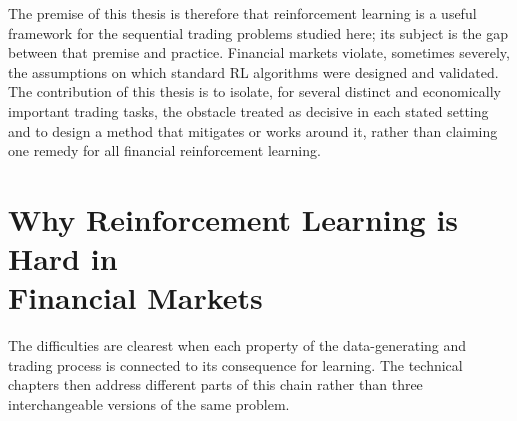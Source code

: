 The premise of this thesis is therefore that reinforcement learning is a useful framework for the sequential trading problems studied here; its subject is the gap between that premise and practice. Financial markets violate, sometimes severely, the assumptions on which standard RL algorithms were designed and validated. The contribution of this thesis is to isolate, for several distinct and economically important trading tasks, the obstacle treated as decisive in each stated setting and to design a method that mitigates or works around it, rather than claiming one remedy for all financial reinforcement learning.

\section[Why Reinforcement Learning is Hard in Financial Markets]{Why Reinforcement Learning is Hard in\\Financial Markets}
\label{sec:intro_challenges}

The difficulties are clearest when each property of the data-generating and trading process is connected to its consequence for learning. The technical chapters then address different parts of this chain rather than three interchangeable versions of the same problem.

